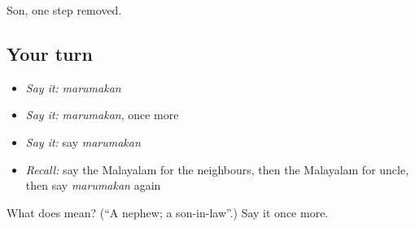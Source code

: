 \begin{grammarlens}[title={What you've built}]
Son, one step removed.
\end{grammarlens}

\subsection*{Your turn}
\begin{itemize}
\raggedright
  \item \emph{Say it:} \emph{marumakan}
  \item \emph{Say it:} \emph{marumakan}, once more
  \item \emph{Say it:} say \emph{marumakan}
  \item \emph{Recall:} say the Malayalam for the neighbours, then the Malayalam for uncle, then say \emph{marumakan} again
\end{itemize}

\begin{tcolorbox}[breakable,colback=teal!4,colframe=teal!35!black,title={Before you move on}]
What does  mean? (\textquotedblleft{}A nephew; a son-in-law\textquotedblright{}.) Say it once more.
\end{tcolorbox}
